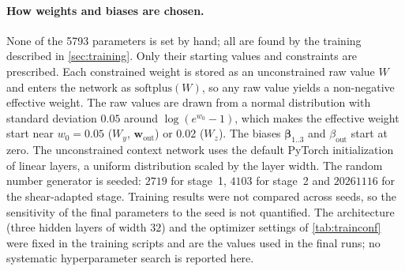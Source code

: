 \paragraph{How weights and biases are chosen.} None of the 5793 parameters is set by
hand; all are found by the training described in \cref{sec:training}. Only their
starting values and constraints are prescribed. Each constrained weight is stored as an
unconstrained raw value $W$ and enters the network as $\mathrm{softplus}(W)$, so any
raw value yields a non-negative effective weight. The raw values are drawn from a
normal distribution with standard deviation $0.05$ around
$\log(e^{w_0}-1)$, which makes the effective weight start near $w_0=0.05$
($W_y$, $\bm w_{\mathrm{out}}$) or $0.02$ ($W_z$). The biases $\bm\beta_{1..3}$ and
$\beta_{\mathrm{out}}$ start at zero. The unconstrained context network uses the default
PyTorch initialization of linear layers, a uniform distribution scaled by the layer
width. The random number generator is seeded: $2719$ for stage~1, $4103$ for stage~2
and $20261116$ for the shear-adapted stage. Training results were not compared across
seeds, so the sensitivity of the final parameters to the seed is not quantified. The
architecture (three hidden layers of width $32$) and the optimizer settings of
\cref{tab:trainconf} were fixed in the training scripts and are the values used in the
final runs; no systematic hyperparameter search is reported here.

